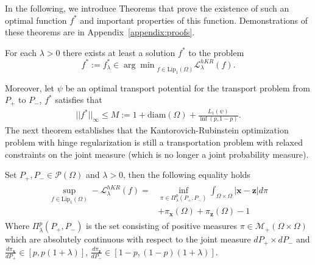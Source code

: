 In the following, we introduce Theorems that prove the existence of such an optimal function $f^*$ and important properties of this function. Demonstrations of these theorems are in Appendix~\ref{appendix:proofs}.
\begin{Theorem} 
\label{Lemma:bounded_M}
 For each $\lambda>0$ there exists at least a solution $f^*$ to the problem  \[ f^*:=f_{\lambda}^*\in{\arg\min}_{f\in \text{Lip}_1(\Omega)}\mathcal{L}^{hKR}_{\lambda}(f) . \]
\end{Theorem}
Moreover, let $\psi$ be an optimal transport potential for the transport problem from $P_+$ to $ P_-$, $f^*$ satisfies that 
\begin{align}\label{eq:M}
	|| f^*||_{\infty}\leq M:= 1+\text{diam}(\Omega)+\frac{L_1(\psi)}{\inf(p,1-p)}.
\end{align}
The next theorem establishes that the Kantorovich-Rubinstein optimization problem with hinge regularization is still a transportation problem with relaxed constraints on the joint measure (which is no longer a joint probability measure).
\begin{Theorem}[Duality]\label{Theo:dual}
Set  $P_+, P_-\in \mathcal{P}(\Omega)$ and $\lambda>0$, then the following equality holds
\begin{align}\label{eq:dual}
\begin{split}
 \sup_{f\in \text{Lip}_1(\Omega)}- \mathcal{L}^{hKR}_\lambda(f)=&	\inf_{\pi \in\Pi^p_{\lambda}(P_+, P_-)}\int_{\Omega\times \Omega}|{\textbf{x}}-{{\textbf{z}}} |d\pi\\
 & + \pi_{\textbf{x}}(\Omega)+\pi_{{\textbf{z}}}(\Omega)-1
	\end{split}
\end{align}
Where $\Pi^p_{\lambda}(P_+, P_-)$ is the set consisting of positive measures $\pi\in \mathcal{M}_+(\Omega\times \Omega)$ which  are absolutely continuous with respect to the joint measure $dP_+\times dP_-$ and $\frac{d\pi_{\textbf{x}}}{dP_+}\in [p, p(1+\lambda)]$, $\frac{d\pi_{{\textbf{z}}}}{dP_-}\in [1-p, (1-p)(1+\lambda)] $.
\end{Theorem}


